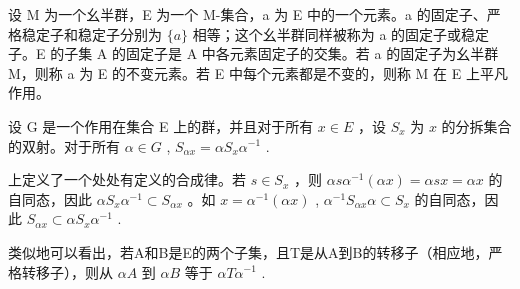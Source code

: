 设 M 为一个幺半群，E 为一个 M-集合，a 为 E 中的一个元素。a 的固定子、严格稳定子和稳定子分别为 \(\{a\}\) 相等；这个幺半群同样被称为 a 的固定子或稳定子。E 的子集 A 的固定子是 A 中各元素固定子的交集。若 a 的固定子为幺半群 M，则称 a 为 E 的不变元素。若 E 中每个元素都是不变的，则称 M 在 E 上平凡作用。

设 G 是一个作用在集合 E 上的群，并且对于所有 \(x \in E\) ，设 \(S_x\) 为 \(x\) 的分拆集合的双射。对于所有 \(\alpha \in G\) , \(S_{\alpha x} = \alpha S_x \alpha^{-1}\) .

上定义了一个处处有定义的合成律。若 \(s \in S_x\) ，则 \(\alpha s \alpha^{-1}(\alpha x) = \alpha s x = \alpha x\) 的自同态，因此 \(\alpha S_x \alpha^{-1} \subset S_{\alpha x}\) 。如 \(x = \alpha^{-1}(\alpha x)\) , \(\alpha^{-1}S_{\alpha x} \alpha \subset S_x\) 的自同态，因此 \(S_{\alpha x} \subset \alpha S_x \alpha^{-1}\) .

类似地可以看出，若A和B是E的两个子集，且T是从A到B的转移子（相应地，严格转移子），则从 \(\alpha A\) 到 \(\alpha B\) 等于 \(\alpha T\alpha^{-1}\) .
\relax{}
